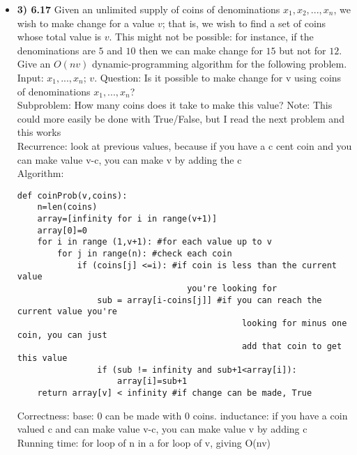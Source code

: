 \documentclass[11pt]{article}
\begin{document}
\begin{itemize}
\begin{itemize}
\vspace{0.05in}

\item \textbf{3) 6.17}
Given an unlimited supply of coins of denominations $x_1, x_2, . . . , x_n$, we wish to make change for a value $v$; that is, we wish to find a set of coins whose total value is $v$. This might not be possible: for instance, if the denominations are $5$ and $10$ then we can make change for $15$ but not for $12$. Give an $O(nv)$ dynamic-programming algorithm for the following problem.
Input: $x_1, . . . , x_n$; $v$. Question: Is it possible to make change for v using coins of denominations $x_1, . . . , x_n$?
\\Subproblem: How many coins does it take to make this value? Note: This could more easily be done with True/False, but I read the next problem and this works
\\Recurrence: look at previous values, because if you have a c cent coin and you can make value v-c, you can make v by adding the c
\\Algorithm:
\begin{verbatim}
def coinProb(v,coins):
    n=len(coins)
    array=[infinity for i in range(v+1)]
    array[0]=0
    for i in range (1,v+1): #for each value up to v
        for j in range(n): #check each coin
            if (coins[j] <=i): #if coin is less than the current value 
                                  you're looking for
                sub = array[i-coins[j]] #if you can reach the current value you're 
                                             looking for minus one coin, you can just 
                                             add that coin to get this value
                if (sub != infinity and sub+1<array[i]):
                    array[i]=sub+1
    return array[v] < infinity #if change can be made, True
\end{verbatim}
Correctness: base: 0 can be made with 0 coins. inductance: if you have a coin valued c and can make value v-c, you can make value v by adding c
\\Running time: for loop of n in a for loop of v, giving O(nv)
\vspace{0.05in}


\end{itemize}
\end{itemize}
\end{document}
